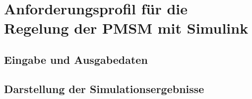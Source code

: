 
\chapter{Anforderungsprofil für die Regelung der PMSM mit Simulink}
\label{cha:anforderungen}

\section{Eingabe und Ausgabedaten}\label{sec:eingabeausgabe}

\section{Darstellung der Simulationsergebnisse}\label{sec:ergebnisse}





